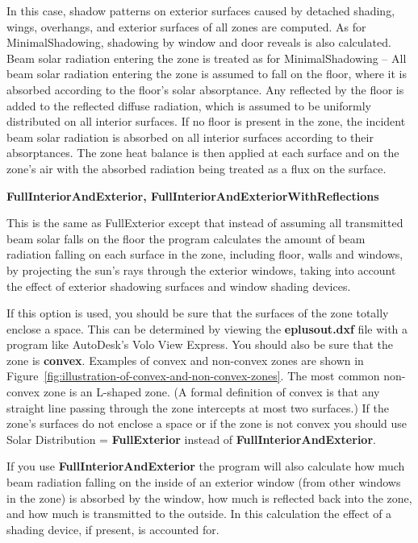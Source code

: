 In this case, shadow patterns on exterior surfaces caused by detached shading, wings, overhangs, and exterior surfaces of all zones are computed. As for MinimalShadowing, shadowing by window and door reveals is also calculated. Beam solar radiation entering the zone is treated as for MinimalShadowing -- All beam solar radiation entering the zone is assumed to fall on the floor, where it is absorbed according to the floor's solar absorptance. Any reflected by the floor is added to the reflected diffuse radiation, which is assumed to be uniformly distributed on all interior surfaces. If no floor is present in the zone, the incident beam solar radiation is absorbed on all interior surfaces according to their absorptances. The zone heat balance is then applied at each surface and on the zone's air with the absorbed radiation being treated as a flux on the surface.

\textbf{FullInteriorAndExterior, FullInteriorAndExteriorWithReflections}

This is the same as FullExterior except that instead of assuming all transmitted beam solar falls on the floor the program calculates the amount of beam radiation falling on each surface in the zone, including floor, walls and windows, by projecting the sun's rays through the exterior windows, taking into account the effect of exterior shadowing surfaces and window shading devices.

If this option is used, you should be sure that the surfaces of the zone totally enclose a space. This can be determined by viewing the \textbf{eplusout.dxf} file with a program like AutoDesk's Volo View Express. You should also be sure that the zone is \textbf{convex}. Examples of convex and non-convex zones are shown in Figure~\ref{fig:illustration-of-convex-and-non-convex-zones}. The most common non-convex zone is an L-shaped zone. (A formal definition of convex is that any straight line passing through the zone intercepts at most two surfaces.) If the zone's surfaces do not enclose a space or if the zone is not convex you should use Solar Distribution = \textbf{FullExterior} instead of \textbf{FullInteriorAndExterior}.

If you use \textbf{FullInteriorAndExterior} the program will also calculate how much beam radiation falling on the inside of an exterior window (from other windows in the zone) is absorbed by the window, how much is reflected back into the zone, and how much is transmitted to the outside. In this calculation the effect of a shading device, if present, is accounted for.

